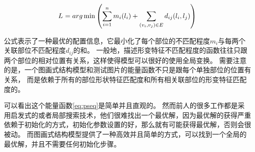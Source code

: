 \begin{equation}
    \label{eq:pseq}
    L^{\*} = arg \min {\left( \sum_{i=1}^{n} m_i(l_i) + \sum_{ (v_i, v_j) \in E } d_{ij}(l_i, l_j) \right)}
\end{equation}

公式表示了一种最优的配置信息，它最小化了每个部位的不匹配程度$m_i$与每两个关联部位不匹配程度$d_{ij}$的和。
一般地，描述形变特征不匹配程度的函数往往只跟两个部位的相对位置有关系，这样使得模型可以很好的使用全局变换。
需要注意的是，一个图画式结构模型和测试图片的能量函数不只是跟每个单独部位的位置有关系，
而是依赖于所有的部位形状特征匹配度和所有相关联部位的形变特征匹配度的。

\begin{figure}[tbp]
    \centering
    \label{fig:ps2}
\end{figure}


可以看出这个能量函数\ref{eq:pseq}是简单并且直观的。
然而前人的很多工作都是采用启发式的或者局部搜索技术，他们很难找出一个最优解，因为最优解的获得严重依赖于初始化的方式，初始化参数设置的好，那么就有可能获得最优解，否则会很被动。
而图画式结构模型提供了一种高效并且简单的方式，可以找到一个全局的最优解，并且不需要任何初始化步骤。

